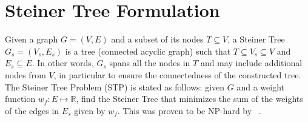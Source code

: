 \documentclass[letterpaper]{article} %
\newcommand{\authornote}[3]{
  {\fbox{\sc 
  #1}:$\blacktriangleright$\textcolor{#2}{\small{#3}}$\blacktriangleleft$}%
}
\newcommand{\ddg}[1]{\authornote{DDG}{blue}{#1}}
\newcommand{\npr}[1]{\authornote{NPR}{orange}{#1}}
\newcommand{\citeasnoun}[1]{\citeauthor{#1}~\shortcite{#1}}
\begin{document}

% 
 

\section{Steiner Tree Formulation \label{SEC:STP}}

Given a graph $G =
(V, E)$ and a subset of its nodes $T \subseteq V$, a 
Steiner Tree $G_s = (V_s, E_s )$ is a tree (connected acyclic graph) such that 
$T \subseteq V_s \subseteq 
V$ and $E_s \subseteq E$. 
In other words, $G_s$ spans all the nodes in $T$ and 
may include additional nodes from $V$, in particular to ensure the 
connectedness of the constructed tree. 
The Steiner Tree Problem 
(STP) is stated as follows: given $G$ and a weight function $w_f : E 
\mapsto \mathbb{R}$, find the Steiner Tree that minimizes the sum of the 
weights of the edges in $E_s$ given by $w_f$. This was proven to be NP-hard 
by \citeasnoun{Karp1972}.
\end{document}
